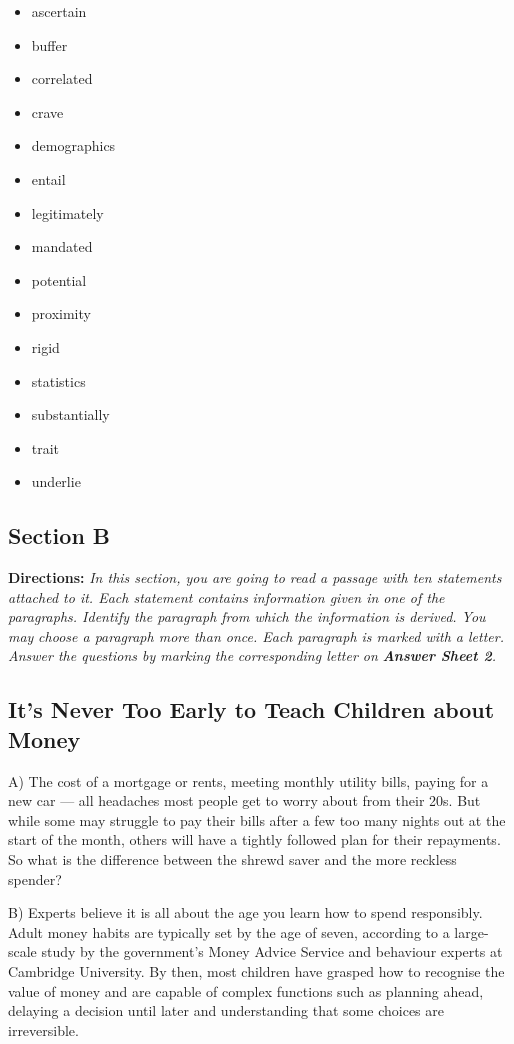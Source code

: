 \documentclass[UTF8,11pt]{ctexart}
\begin{document}
\begin{itemize}[leftmargin=2em,itemsep=.2em,topsep=.4em]\item[A.] ascertain
\item[B.] buffer
\item[C.] correlated
\item[D.] crave
\item[E.] demographics
\item[F.] entail
\item[G.] legitimately
\item[H.] mandated
\item[I.] potential
\item[J.] proximity
\item[K.] rigid
\item[L.] statistics
\item[M.] substantially
\item[N.] trait
\item[O.] underlie
\end{itemize}

\subsection*{\textbf{Section B}}


\textbf{Directions:} \textit{In this section, you are going to read a passage with ten statements attached to it. Each statement contains} \textit{information given in one of the paragraphs. Identify the paragraph from which the information is derived. You may} \textit{choose a paragraph more than once. Each paragraph is marked with a letter. Answer the questions by marking the} \textit{corresponding letter on }\textbf{\textit{Answer Sheet 2}}\textit{.}


\subsection*{\textbf{It’s Never Too Early to Teach Children about Money}}


A) The cost of a mortgage or rents, meeting monthly utility bills, paying for a new car — all headaches most people get to worry about from their 20s. But while some may struggle to pay their bills after a few too many nights out at the start of the month, others will have a tightly followed plan for their repayments. So what is the difference between the shrewd saver and the more reckless spender?


B) Experts believe it is all about the age you learn how to spend responsibly. Adult money habits are typically set by the age of seven, according to a large-scale study by the government’s Money Advice Service and behaviour experts at Cambridge University. By then, most children have grasped how to recognise the value of money and are capable of complex functions such as planning ahead, delaying a decision until later and understanding that some choices are irreversible.
\end{document}
